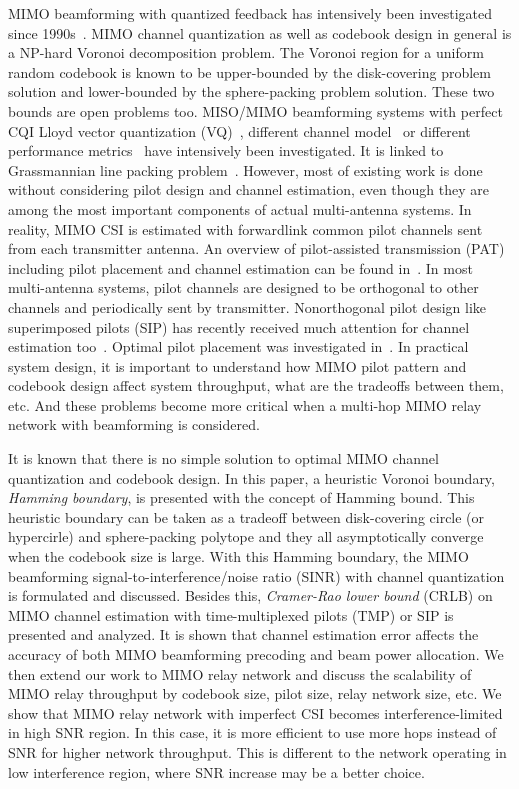 \documentclass[conference]{IEEEtran}
\begin{document}
MIMO beamforming with quantized feedback has intensively been
investigated since 1990s~\cite{Gerlach94}. MIMO channel
quantization as well as codebook design in general is a NP-hard
Voronoi decomposition problem. The Voronoi region for a uniform
random codebook is known to be upper-bounded by the disk-covering
problem solution and lower-bounded by the sphere-packing problem
solution. These two bounds are open problems too. MISO/MIMO
beamforming systems with perfect CQI Lloyd vector quantization
(VQ)~\cite{Narula98}, different channel model~\cite{Mukka03} or
different performance metrics~\cite{PXia04,Roh04} have intensively
been investigated. It is linked to Grassmannian line packing
problem~\cite{Love02}. However, most of existing work is done
without considering pilot design and channel estimation, even
though they are among the most important components of actual
multi-antenna systems. In reality, MIMO CSI is estimated with
forwardlink common pilot channels sent from each transmitter
antenna. An overview of pilot-assisted transmission (PAT)
including pilot placement and channel estimation can be found
in~\cite{Tong04}. In most multi-antenna systems, pilot channels
are designed to be orthogonal to other channels and periodically
sent by transmitter. Nonorthogonal pilot design like superimposed
pilots (SIP) has recently received much attention for channel
estimation too~\cite{Coldrey06}. Optimal pilot placement was
investigated in~\cite{Dong02}. In practical system design, it is
important to understand how MIMO pilot pattern and codebook design
affect system throughput, what are the tradeoffs between them,
etc. And these problems become more critical when a multi-hop MIMO
relay network with beamforming is considered.

It is known that there is no simple solution to optimal MIMO
channel quantization and codebook design. In this paper, a
heuristic Voronoi boundary, {\em Hamming boundary}, is presented
with the concept of Hamming bound. This heuristic boundary can be
taken as a tradeoff between disk-covering circle (or hypercirle)
and sphere-packing polytope and they all asymptotically converge
when the codebook size is large. With this Hamming boundary, the
MIMO beamforming signal-to-interference/noise ratio (SINR) with
channel quantization is formulated and discussed. Besides this,
{\em Cramer-Rao lower bound} (CRLB) on MIMO channel estimation
with time-multiplexed pilots (TMP) or SIP is presented and
analyzed. It is shown that channel estimation error affects the
accuracy of both MIMO beamforming precoding and beam power
allocation. We then extend our work to MIMO relay network and
discuss the scalability of MIMO relay throughput by codebook size,
pilot size, relay network size, etc. We show that MIMO relay
network with imperfect CSI becomes interference-limited in high
SNR region. In this case, it is more efficient to use more hops
instead of SNR for higher network throughput. This is different to
the network operating in low interference region, where SNR
increase may be a better choice.
\end{document}
